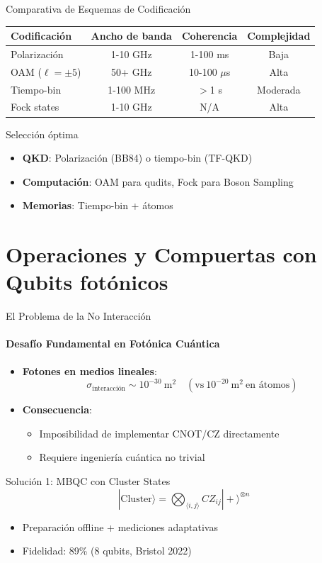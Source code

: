 \documentclass{beamer}
\begin{document}
\begin{frame}{Comparativa de Esquemas de Codificación}
\begin{table}[h]
\centering
\small
\begin{tabular}{|l|c|c|c|}
\hline
\textbf{Codificación} & \textbf{Ancho de banda} & \textbf{Coherencia} & \textbf{Complejidad} \\
\hline
Polarización & 1-10 GHz & 1-100 ms & Baja \\
OAM ($\ell=\pm 5$) & 50+ GHz & 10-100 $\mu$s & Alta \\
Tiempo-bin & 1-100 MHz & $>$1 s & Moderada \\
Fock states & 1-10 GHz & N/A & Alta \\
\hline
\end{tabular}
\end{table}

\begin{block}{Selección óptima}
\begin{itemize}
    \item \textbf{QKD}: Polarización (BB84) o tiempo-bin (TF-QKD)
    \item \textbf{Computación}: OAM para qudits, Fock para Boson Sampling
    \item \textbf{Memorias}: Tiempo-bin + átomos
\end{itemize}
\end{block}
\end{frame}

\section{Operaciones y Compuertas con Qubits fotónicos}
\begin{frame}{El Problema de la No Interacción}
\framesubtitle{Desafío Fundamental en Fotónica Cuántica}

\begin{itemize}
    \item \textbf{Fotones en medios lineales}:
    \[
    \sigma_{\text{interacción}} \sim 10^{-30}\ \text{m}^2 \quad (\text{vs}\ 10^{-20}\ \text{m}^2\ \text{en átomos})
    \]
    
    \item \textbf{Consecuencia}:
    \begin{itemize}
        \item Imposibilidad de implementar CNOT/CZ directamente
        \item Requiere ingeniería cuántica no trivial
    \end{itemize}
\end{itemize}

\begin{block}{Solución 1: MBQC con Cluster States}
\[
|\text{Cluster}\rangle = \bigotimes_{\langle i,j \rangle} CZ_{ij} |+\rangle^{\otimes n}
\]
\begin{itemize}
    \item Preparación offline + mediciones adaptativas
    \item Fidelidad: 89\% (8 qubits, Bristol 2022)
\end{itemize}
\end{block}
\end{frame}
\end{document}
